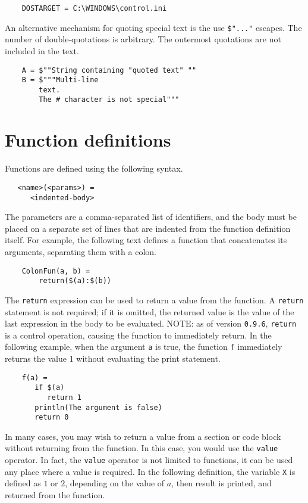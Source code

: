 \begin{verbatim}
    DOSTARGET = C:\WINDOWS\control.ini
\end{verbatim}

An alternative mechanism for quoting special text is the use \verb+$"..."+ escapes.  The number of
double-quotations is arbitrary.  The outermost quotations are not included in the text.

\begin{verbatim}
    A = $""String containing "quoted text" ""
    B = $"""Multi-line
        text.
        The # character is not special"""
\end{verbatim}

\section{Function definitions}
\label{section:functions}

Functions are defined using the following syntax.

\begin{verbatim}
   <name>(<params>) =
      <indented-body>
\end{verbatim}

The parameters are a comma-separated list of identifiers, and the body must be placed on a separate
set of lines that are indented from the function definition itself.  For example, the following text
defines a function that concatenates its arguments, separating them with a colon.

\begin{verbatim}
    ColonFun(a, b) =
        return($(a):$(b))
\end{verbatim}

%
The \verb+return+ expression can be used to return a value from the function.  A \verb+return+
statement is not required; if it is omitted, the returned value is the value of the last expression
in the body to be evaluated.  NOTE: as of version \verb+0.9.6+, \verb+return+ is a control
operation, causing the function to immediately return.  In the following example, when the argument
\verb+a+ is true, the function \verb+f+ immediately returns the value 1 without evaluating the print
statement.

\begin{verbatim}
    f(a) =
       if $(a)
          return 1
       println(The argument is false)
       return 0
\end{verbatim}

%
In many cases, you may wish to return a value from a section or code block without returning from
the function.  In this case, you would use the \verb+value+ operator.  In fact, the \verb+value+
operator is not limited to functions, it can be used any place where a value is required.  In the
following definition, the variable \verb+X+ is defined as $1$ or $2$, depending on the value of $a$,
then result is printed, and returned from the function.

